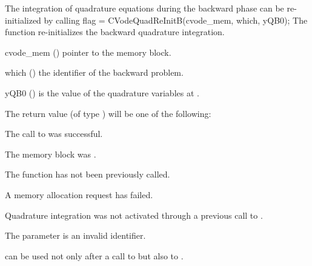 The integration of quadrature equations during the backward phase can be
re-initialized by calling
{
  flag = CVodeQuadReInitB(cvode\_mem, which, yQB0);
}
{
  The function  re-initializes the backward quadrature integration.
}
{
  \begin{args}
  \item[cvode\_mem] ()
    pointer to the {\cvodes} memory block.
  \item[which] ()
    the identifier of the backward problem.
  \item[yQB0] ()
    is the value of the quadrature variables at .
  \end{args}
}
{
  The return value  (of type ) will be one of the following:
  \begin{args}
  \item[\Id{CV\_SUCCESS}]
    The call to  was successful.
 \item[\Id{CV\_MEM\_NULL}] 
    The  memory block was .
  \item[\Id{CV\_NO\_ADJ}]
    The function  has not been previously called.
  \item[\Id{CV\_MEM\_FAIL}] 
    A memory allocation request has failed.
  \item[\Id{CV\_NO\_QUAD}] 
    Quadrature integration was not activated through a  previous 
    call to .
  \item[\Id{CV\_ILL\_INPUT}]
    The parameter  is an invalid identifier.
  \end{args}
}
{
   can be used not only after a call to  but
  also to .
}

